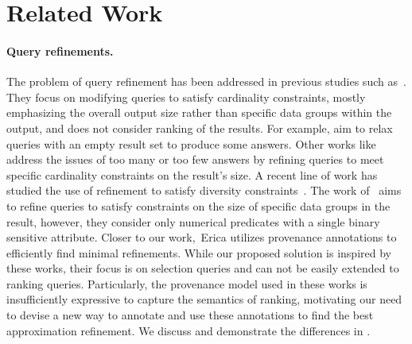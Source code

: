 \section{Related Work}
\label{sec:related}


\paragraph*{\textbf{Query refinements.}} The problem of query refinement has been addressed in previous studies such as~\cite{muslea2005online, KoudasLTV06, MK09, chu1994structured, tran2010conquer, tran2009query}. 
They focus on modifying queries to satisfy cardinality constraints, mostly emphasizing the overall output size rather than specific data groups within the output, and does not consider ranking of the results. 
For example, \cite{muslea2005online, KoudasLTV06} aim to relax queries with an empty result set to produce some answers. Other works like~\cite{MK09, chu1994structured} address the issues of too many or too few answers by refining queries to meet specific cardinality constraints on the result's size.
A recent line of work has studied the use of refinement to satisfy diversity constraints~\cite{MLJ22,ERICA,SSAD22}. The work of~\cite{SSAD22} aims to refine queries to satisfy constraints on the size of specific data groups in the result, however, they consider only numerical predicates with a single binary sensitive attribute. Closer to our work,~Erica \cite{MLJ22,ERICA,ERICAfull} utilizes provenance annotations to efficiently find minimal refinements. While our proposed solution is inspired by these works, their focus is on selection queries and can not be easily extended to ranking queries. Particularly, the provenance model used in these works is insufficiently expressive to capture the semantics of ranking, motivating our need to devise a new way to annotate and use these annotations to find the best approximation refinement. We discuss and demonstrate the differences
in .


